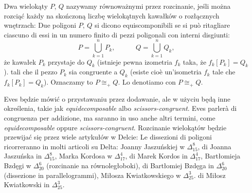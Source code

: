 \begin{definition}
    \label{definicja_rownowazne_przez_dodawanie}%
    Dwa wielokąty $P$, $Q$ nazywamy równoważnymi przez rozcinanie, jeśli można rozciąć każdy na skończoną liczbę wielokątnych kawałków o rozłącznych wnętrzach:   %
    Due poligoni $P$, $Q$ si dicono equiscomponibili se si può ritagliare ciascuno di essi in un numero finito di pezzi poligonali con interni disgiunti: %
    \begin{equation}
        P = \bigcup_{k=1}^n P_k, \quad\quad\quad Q = \bigcup_{k=1}^n Q_k,
    \end{equation}
    że kawałek $P_k$ przystaje do $Q_k$ (istnieje pewna izometria $f_k$ taka, że $f_k[P_k] = Q_k$). %
    tali che il pezzo $P_k$ sia congruente a $Q_k$ (esiste cioè un'isometria $f_k$ tale che $f_k[P_k] = Q_k$). %
    Oznaczamy to $P \cong_+ Q$. %
    Lo denotiamo con $P \cong_+ Q$. %
\end{definition}

Eves będzie mówić o przystawaniu przez dodawanie, ale w użyciu będą inne określenia, takie jak \emph{equidecomposable} albo \emph{scissors-congruent}. %
Eves parlerà di congruenza per addizione, ma saranno in uso anche altri termini, come \emph{equidecomposable} oppure \emph{scissors-congruent}. %
Rozcinanie wielokątów będzie przewijać się przez wiele artykułów w Delcie: %
Le dissezioni di poligoni ricorreranno in molti articoli su Delta: %
Joanny Jaszuńskiej w $\Delta_{15}^{8}$, %
di Joanna Jaszuńska in $\Delta_{15}^{8}$, %
Marka Kordosa w $\Delta_{17}^4$, %
di Marek Kordos in $\Delta_{17}^4$, %
Bartłomieja Bzdęgi w $\Delta_{20}^6$ (rozcinanie na równoległoboki), %
di Bartłomiej Bzdęga in $\Delta_{20}^6$ (dissezione in parallelogrammi), %
Miłosza Kwiatkowskiego w $\Delta_{25}^3$. %
di Miłosz Kwiatkowski in $\Delta_{25}^3$. %

